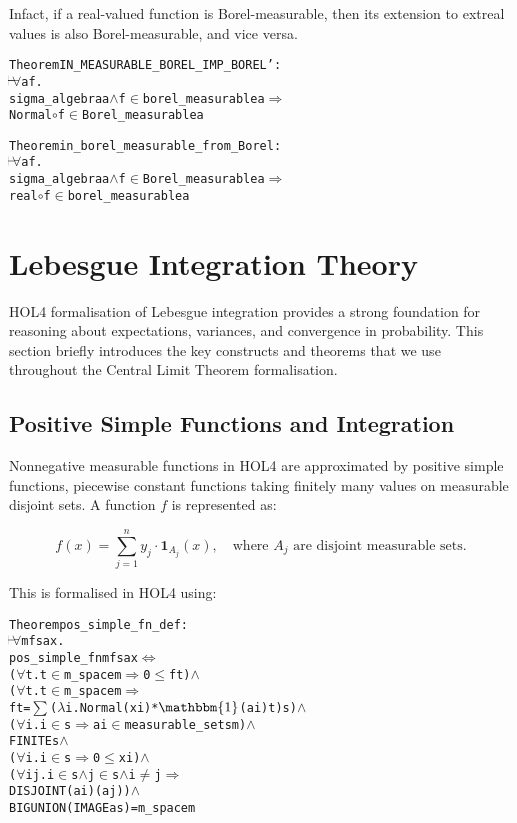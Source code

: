 Infact, if a real-valued function is Borel-measurable, then its extension to extreal values is also Borel-measurable, and vice versa.

\begin{hol}
\begin{alltt}
Theorem IN\_MEASURABLE\_BOREL\_IMP\_BOREL' :
\(\!\!\!{\turn}\!\!\!\!\) \(\forall\)a f.
sigma\_algebra a \(\land\) f \(\in\) borel\_measurable a \(\Rightarrow\)
Normal \(\circ\) f \(\in\) Borel\_measurable a
\end{alltt}
\end{hol}

\begin{hol}
\begin{alltt}
Theorem in\_borel\_measurable\_from\_Borel :
\(\!\!\!{\turn}\!\!\!\!\) \(\forall\)a f.
sigma\_algebra a \(\land\) f \(\in\) Borel\_measurable a \(\Rightarrow\)
real \(\circ\) f \(\in\) borel\_measurable a
\end{alltt}
\end{hol}

\section{Lebesgue Integration Theory}

HOL4 formalisation of Lebesgue integration provides a strong foundation for reasoning about expectations, variances, and convergence in probability. This section briefly introduces the key constructs and theorems that we use throughout the Central Limit Theorem formalisation.

\subsection{Positive Simple Functions and Integration}

Nonnegative measurable functions in HOL4 are approximated by positive simple functions, piecewise constant functions taking finitely many values on measurable disjoint sets. A function $f$ is represented as:

\[
f(x) = \sum_{j=1}^n y_j \cdot \mathbf{1}_{A_j}(x), \quad \text{where } A_j \text{ are disjoint measurable sets}.
\]

This is formalised in HOL4 using:
\begin{hol}
\begin{alltt}
Theorem pos\_simple\_fn\_def :
\(\!\!\!{\turn}\!\!\!\!\) \(\forall\)m f s a x.
pos\_simple\_fn m f s a x \({\Leftrightarrow}\)
(\(\forall\)t. t \(\in\) m\_space m \(\Rightarrow\) 0 \(\le\) f t) \(\land\)
(\(\forall\)t. t \(\in\) m\_space m \(\Rightarrow\)
        f t = \(\sum\) (\(\lambda\)i. Normal (x i) * \(\mathbbm{1}\) (a i) t) s) \(\land\)
(\(\forall\)i. i \(\in\) s \(\Rightarrow\) a i \(\in\) measurable\_sets m) \(\land\)
FINITE s \(\land\)
(\(\forall\)i. i \(\in\) s \(\Rightarrow\) 0 \(\le\) x i) \(\land\)
(\(\forall\)i j. i \(\in\) s \(\land\) j \(\in\) s \(\land\) i \(\ne\) j \(\Rightarrow\)
        DISJOINT (a i) (a j)) \(\land\)
BIGUNION (IMAGE a s) = m\_space m
\end{alltt}
\end{hol}

